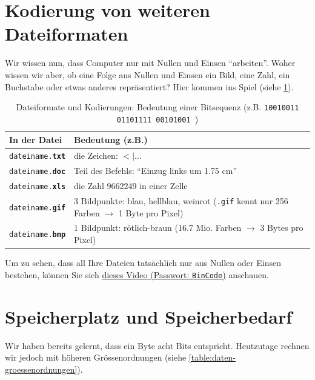 \section{Kodierung von weiteren Dateiformaten}
Wir wissen nun, dass Computer nur mit Nullen und Einsen \enquote{arbeiten}. Woher wissen wir aber, ob eine Folge aus Nullen und Einsen ein Bild, eine Zahl, ein Buchstabe oder etwas anderes repräsentiert? Hier kommen  ins Spiel (siehe \cref{table:formats-codes}).

\begin{table}[H]
	\centering
	\begin{tabular}{l|p{11cm}}
		\textbf{In der Datei}           & \textbf{Bedeutung (z.B.)}                                                                                 \\\midrule
		\texttt{dateiname.\textbf{txt}} & die Zeichen: $<|\ldots$                                                                                   \\
		\texttt{dateiname.\textbf{doc}} & Teil des Befehls: \enquote{Einzug links um 1.75 cm}                                                       \\
		\texttt{dateiname.\textbf{xls}} & die Zahl 9662249 in einer Zelle                                                                           \\
		\texttt{dateiname.\textbf{gif}} & 3 Bildpunkte: blau, hellblau, weinrot (\texttt{.gif} kennt nur 256 Farben $\rightarrow$ 1 Byte pro Pixel) \\
		\texttt{dateiname.\textbf{bmp}} & 1 Bildpunkt: rötlich-braun (16.7 Mio. Farben $\rightarrow$ 3 Bytes pro Pixel)
	\end{tabular}
	\caption{Dateiformate und Kodierungen: Bedeutung einer Bitsequenz (z.B. \texttt{10010011   01101111   00101001
		})}
	\label{table:formats-codes}
\end{table}

\begin{myexercise}
	Um zu sehen, dass all Ihre Dateien tatsächlich nur aus Nullen oder Einsen bestehen, können Sie sich \href{https://cvb.synology.me:5001/d/s/17j56PD0TR1s6D9dFpPiexLX5RNNUTK4/psAJkcIbyyhKXtCqFnxQVzUAr_o8XvVC-FbZAcEBqGQ0}{dieses Video (Passwort: \texttt{BinCode})} anschauen.
\end{myexercise}


\section{Speicherplatz und Speicherbedarf}
Wir haben bereits gelernt, dass ein Byte acht Bits entspricht. Heutzutage rechnen wir jedoch mit höheren Grössenordnungen (siehe \cref{table:daten-groessenordnungen}).

